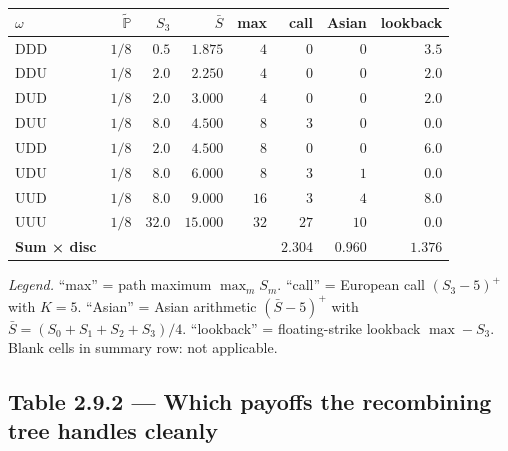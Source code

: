\documentclass[
  10pt,
  twoside]{book}
\newcounter{none} %
\begin{document}
{\def\LTcaptype{none} %
\begin{table}[H]
\centering
\begin{tabular}{|l|r|r|r|r|r|r|r|}
\toprule
\(\omega\) & \(\tilde{\mathbb P}\) & \(S_3\) & \(\bar S\) & max & call & Asian & lookback \\
\midrule



DDD & \(1/8\) & \(\phantom{0}0.5\) & \(\phantom{0}1.875\) &
\(\phantom{0}4\) & \(\phantom{0}0\) & \(\phantom{0}0\) & \(3.5\) \\
DDU & \(1/8\) & \(\phantom{0}2.0\) & \(\phantom{0}2.250\) &
\(\phantom{0}4\) & \(\phantom{0}0\) & \(\phantom{0}0\) & \(2.0\) \\
DUD & \(1/8\) & \(\phantom{0}2.0\) & \(\phantom{0}3.000\) &
\(\phantom{0}4\) & \(\phantom{0}0\) & \(\phantom{0}0\) & \(2.0\) \\
DUU & \(1/8\) & \(\phantom{0}8.0\) & \(\phantom{0}4.500\) &
\(\phantom{0}8\) & \(\phantom{0}3\) & \(\phantom{0}0\) & \(0.0\) \\
UDD & \(1/8\) & \(\phantom{0}2.0\) & \(\phantom{0}4.500\) &
\(\phantom{0}8\) & \(\phantom{0}0\) & \(\phantom{0}0\) & \(6.0\) \\
UDU & \(1/8\) & \(\phantom{0}8.0\) & \(\phantom{0}6.000\) &
\(\phantom{0}8\) & \(\phantom{0}3\) & \(\phantom{0}1\) & \(0.0\) \\
UUD & \(1/8\) & \(\phantom{0}8.0\) & \(\phantom{0}9.000\) & \(16\) &
\(\phantom{0}3\) & \(\phantom{0}4\) & \(8.0\) \\
UUU & \(1/8\) & \(32.0\) & \(15.000\) & \(32\) & \(27\) & \(10\) &
\(0.0\) \\
\textbf{Sum × disc} & & & & & \(\mathbf{2.304}\) & \(\mathbf{0.960}\) &
\(\mathbf{1.376}\) \\
\bottomrule
\end{tabular}
\end{table}
}

\emph{Legend.} ``max'' = path maximum \(\max_m S_m\). ``call'' =
European call \((S_3-5)^+\) with \(K=5\). ``Asian'' = Asian arithmetic
\((\bar S-5)^+\) with \(\bar S = (S_0+S_1+S_2+S_3)/4\). ``lookback'' =
floating-strike lookback \(\max - S_3\). Blank cells in summary row: not
applicable.

\subsection{Table 2.9.2 --- Which payoffs the recombining tree handles
cleanly}\label{table-2.9.2-which-payoffs-the-recombining-tree-handles-cleanly}
\end{document}

